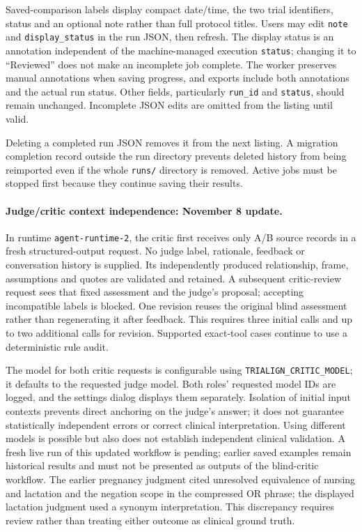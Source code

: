 \documentclass[10pt,letterpaper]{article}
\newcommand{\pathcode}[1]{\nolinkurl{#1}}
\begin{document}
Saved-comparison labels display compact date/time, the two trial identifiers,
status and an optional note rather than full protocol titles. Users may edit
\pathcode{note} and \pathcode{display_status} in the run JSON, then refresh.
The display status is an annotation independent of the machine-managed
execution \pathcode{status}; changing it to ``Reviewed'' does not make an
incomplete job complete. The worker preserves manual annotations when saving
progress, and exports include both annotations and the actual run status.
Other fields, particularly \pathcode{run_id} and \pathcode{status}, should remain
unchanged. Incomplete JSON edits are omitted from the listing until valid.

Deleting a completed run JSON removes it from the next listing. A migration
completion record outside the run directory prevents deleted history from
being reimported even if the whole \pathcode{runs/} directory is removed.
Active jobs must be stopped first because they continue saving their results.

\paragraph{Judge/critic context independence: November 8 update.}
In runtime \pathcode{agent-runtime-2}, the critic first receives only A/B source
records in a fresh structured-output request. No judge label, rationale,
feedback or conversation history is supplied. Its independently produced
relationship, frame, assumptions and quotes are validated and retained. A
subsequent critic-review request sees that fixed assessment and the judge's
proposal; accepting incompatible labels is blocked. One revision reuses the
original blind assessment rather than regenerating it after feedback. This
requires three initial calls and up to two additional calls for revision.
Supported exact-tool cases continue to use a deterministic rule audit.

The model for both critic requests is configurable using
\pathcode{TRIALIGN_CRITIC_MODEL}; it defaults to the requested judge model.
Both roles' requested model IDs are logged, and the settings dialog displays
them separately. Isolation of initial input contexts prevents direct anchoring
on the judge's answer; it does not guarantee statistically independent errors
or correct clinical interpretation. Using different models is possible but
also does not establish independent clinical validation. A fresh live run of
this updated workflow is pending; earlier saved examples remain historical
results and must not be presented as outputs of the blind-critic workflow.
The earlier pregnancy judgment cited unresolved equivalence of nursing and
lactation and the negation scope in the compressed OR phrase; the displayed
lactation judgment used a synonym interpretation. This discrepancy requires
review rather than treating either outcome as clinical ground truth.
\end{document}
